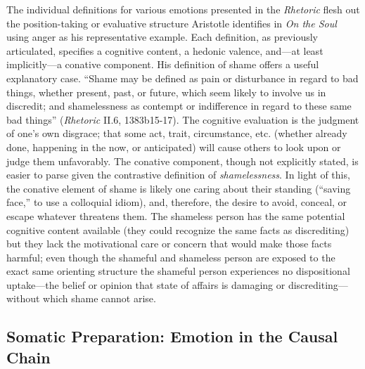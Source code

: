 \documentclass{article}
\begin{document}
The individual definitions for various emotions presented in the \textit{Rhetoric} flesh out the position-taking or evaluative structure Aristotle identifies in \textit{On the Soul} using anger as his representative example. Each definition, as previously articulated, specifies a cognitive content, a hedonic valence, and---at least implicitly---a conative component. His definition of shame offers a useful explanatory case. ``Shame may be defined as pain or disturbance in regard to bad things, whether present, past, or future, which seem likely to involve us in discredit; and shamelessness as contempt or indifference in regard to these same bad things'' (\textit{Rhetoric} II.6, 1383b15-17). The cognitive evaluation is the judgment of one's own disgrace; that some act, trait, circumstance, etc. (whether already done, happening in the now, or anticipated) will cause others to look upon or judge them unfavorably. The conative component, though not explicitly stated, is easier to parse given the contrastive definition of \textit{shamelessness}. In light of this, the conative element of shame is likely one caring about their standing (``saving face,'' to use a colloquial idiom), and, therefore, the desire to avoid, conceal, or escape whatever threatens them. The shameless person has the same potential cognitive content available (they could recognize the same facts as discrediting) but they lack the motivational care or concern that would make those facts harmful; even though the shameful and shameless person are exposed to the exact same orienting structure the shameful person experiences no dispositional uptake---the belief or opinion that state of affairs is damaging or discrediting---without which shame cannot arise. 

\subsection{Somatic Preparation: Emotion in the Causal Chain}
\end{document}
